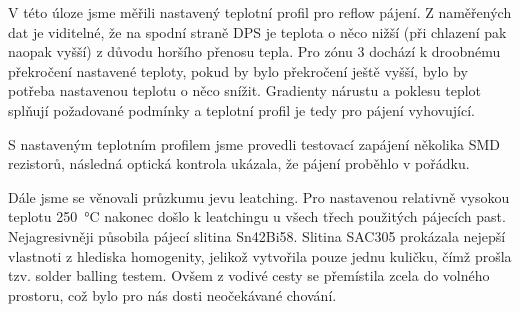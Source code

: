 V této úloze jsme měřili nastavený teplotní profil pro reflow pájení. Z naměřených dat je viditelné, že na spodní straně DPS je teplota o něco nižší (při chlazení pak naopak vyšší) z důvodu horšího přenosu tepla. Pro zónu 3 dochází k droobnému překročení nastavené teploty, pokud by bylo překročení ještě vyšší, bylo by potřeba nastavenou teplotu o něco snížit. Gradienty nárustu a poklesu teplot splňují požadované podmínky a teplotní profil je tedy pro pájení vyhovující. 

S nastaveným teplotním profilem jsme provedli testovací zapájení několika SMD rezistorů, následná optická kontrola ukázala, že pájení proběhlo v pořádku. 

Dále jsme se věnovali průzkumu jevu leatching. Pro nastavenou relativně vysokou teplotu \qty{250}{\degreeCelsius} nakonec došlo k leatchingu u všech třech použitých pájecích past. Nejagresivněji působila pájecí slitina Sn42Bi58. Slitina SAC305 prokázala nejepší vlastnoti z hlediska homogenity, jelikož vytvořila pouze jednu kuličku, čímž prošla tzv. solder balling testem. Ovšem z vodivé cesty se přemístila zcela do volného prostoru, což bylo pro nás dosti neočekávané chování. 